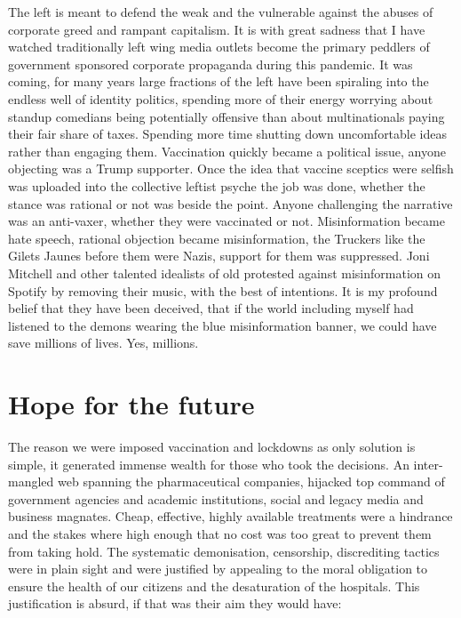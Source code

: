\documentclass[11pt,a4paper]{article}
\begin{document}
The left is meant to defend the weak and the vulnerable against the abuses of corporate greed and rampant capitalism. It is with great sadness that I have watched traditionally left wing media outlets become the primary peddlers of government sponsored corporate propaganda during this pandemic. It was coming, for many years large fractions of the left have been spiraling into the endless well of identity politics, spending more of their energy worrying about standup comedians being potentially offensive than about multinationals paying their fair share of taxes. Spending more time shutting down uncomfortable ideas rather than engaging them. Vaccination quickly became a political issue, anyone objecting was a Trump supporter. Once the idea that vaccine sceptics were selfish was uploaded into the collective leftist psyche the job was done, whether the stance was rational or not was beside the point. Anyone challenging the narrative was an anti-vaxer, whether they were vaccinated or not. Misinformation became hate speech, rational objection became misinformation, the Truckers like the Gilets Jaunes before them were Nazis, support for them was suppressed. Joni Mitchell and other talented idealists of old protested against misinformation on Spotify by removing their music, with the best of intentions. It is my profound belief that they have been deceived, that if the world including myself had listened to the demons wearing the blue misinformation banner, we could have save millions of lives. Yes, millions.


\section*{Hope for the future}

The reason we were imposed vaccination and lockdowns as only solution is simple, it generated immense wealth for those who took the decisions. An inter-mangled web spanning the pharmaceutical companies, hijacked top command of government agencies and academic institutions, social and legacy media and business magnates. Cheap, effective, highly available treatments were a hindrance and the stakes where high enough that no cost was too great to prevent them from taking hold. The systematic demonisation, censorship, discrediting tactics were in plain sight and were justified by appealing to the moral obligation to ensure the health of our citizens and the desaturation of the hospitals. This justification is absurd, if that was their aim they would have:
\end{document}
